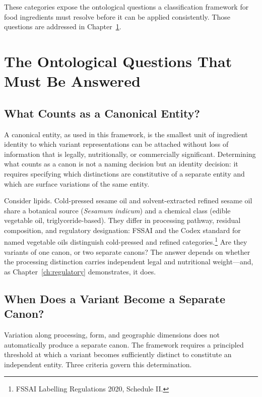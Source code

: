 \documentclass[12pt,a3paper]{article}
\begin{document}
These categories expose the ontological questions a classification framework for food ingredients must resolve before it can be applied consistently. Those questions are addressed in Chapter~\ref{ch:ontological}.

\newpage


\section{The Ontological Questions That Must Be Answered}
\label{ch:ontological}

\subsection{What Counts as a Canonical Entity?}

A canonical entity, as used in this framework, is the smallest unit of ingredient identity to which variant representations can be attached without loss of information that is legally, nutritionally, or commercially significant. Determining what counts as a canon is not a naming decision but an identity decision: it requires specifying which distinctions are constitutive of a separate entity and which are surface variations of the same entity.

Consider lipids. Cold-pressed sesame oil and solvent-extracted refined sesame oil share a botanical source (\textit{Sesamum indicum}) and a chemical class (edible vegetable oil, triglyceride-based). They differ in processing pathway, residual composition, and regulatory designation: FSSAI and the Codex standard for named vegetable oils distinguish cold-pressed and refined categories.\footnote{FSSAI Labelling Regulations 2020, Schedule II.} Are they variants of one canon, or two separate canons? The answer depends on whether the processing distinction carries independent legal and nutritional weight---and, as Chapter~\ref{ch:regulatory} demonstrates, it does.

\subsection{When Does a Variant Become a Separate Canon?}

Variation along processing, form, and geographic dimensions does not automatically produce a separate canon. The framework requires a principled threshold at which a variant becomes sufficiently distinct to constitute an independent entity. Three criteria govern this determination.
\end{document}
